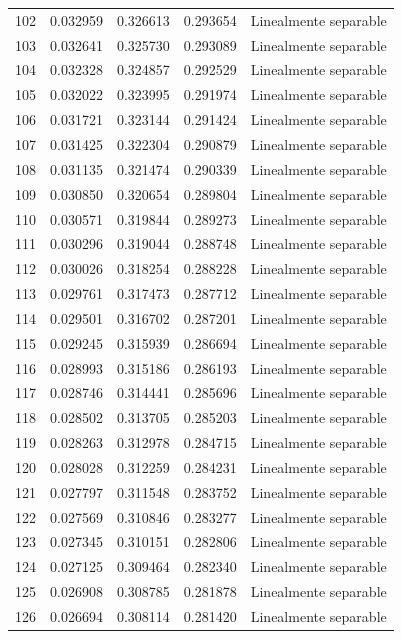 \begin{tabular}{lllll}
102 & 0.032959 & 0.326613 & 0.293654 & Linealmente separable \\
103 & 0.032641 & 0.325730 & 0.293089 & Linealmente separable \\
104 & 0.032328 & 0.324857 & 0.292529 & Linealmente separable \\
105 & 0.032022 & 0.323995 & 0.291974 & Linealmente separable \\
106 & 0.031721 & 0.323144 & 0.291424 & Linealmente separable \\
107 & 0.031425 & 0.322304 & 0.290879 & Linealmente separable \\
108 & 0.031135 & 0.321474 & 0.290339 & Linealmente separable \\
109 & 0.030850 & 0.320654 & 0.289804 & Linealmente separable \\
110 & 0.030571 & 0.319844 & 0.289273 & Linealmente separable \\
111 & 0.030296 & 0.319044 & 0.288748 & Linealmente separable \\
112 & 0.030026 & 0.318254 & 0.288228 & Linealmente separable \\
113 & 0.029761 & 0.317473 & 0.287712 & Linealmente separable \\
114 & 0.029501 & 0.316702 & 0.287201 & Linealmente separable \\
115 & 0.029245 & 0.315939 & 0.286694 & Linealmente separable \\
116 & 0.028993 & 0.315186 & 0.286193 & Linealmente separable \\
117 & 0.028746 & 0.314441 & 0.285696 & Linealmente separable \\
118 & 0.028502 & 0.313705 & 0.285203 & Linealmente separable \\
119 & 0.028263 & 0.312978 & 0.284715 & Linealmente separable \\
120 & 0.028028 & 0.312259 & 0.284231 & Linealmente separable \\
121 & 0.027797 & 0.311548 & 0.283752 & Linealmente separable \\
122 & 0.027569 & 0.310846 & 0.283277 & Linealmente separable \\
123 & 0.027345 & 0.310151 & 0.282806 & Linealmente separable \\
124 & 0.027125 & 0.309464 & 0.282340 & Linealmente separable \\
125 & 0.026908 & 0.308785 & 0.281878 & Linealmente separable \\
126 & 0.026694 & 0.308114 & 0.281420 & Linealmente separable \\

\end{tabular}
